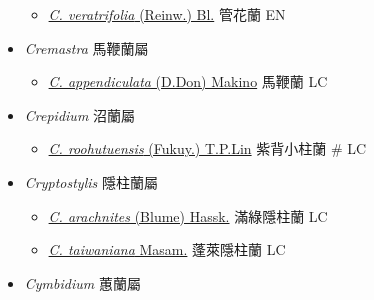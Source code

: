 \begin{itemize}
  \begin{itemize}
        \item[] \href{http://www.theplantlist.org/tpl1.1/search?q=Corymborkis+veratrifolia}{\textit{C. veratrifolia} (Reinw.) Bl.}   管花蘭   EN
  \end{itemize}
 \item[] \textit{Cremastra} 馬鞭蘭屬
                                
  \begin{itemize}
        \item[] \href{http://www.theplantlist.org/tpl1.1/search?q=Cremastra+appendiculata}{\textit{C. appendiculata} (D.Don) Makino}   馬鞭蘭   LC
  \end{itemize}
 \item[] \textit{Crepidium} 沼蘭屬
                                
  \begin{itemize}
        \item[] \href{http://www.theplantlist.org/tpl1.1/search?q=Crepidium+roohutuensis}{\textit{C. roohutuensis} (Fukuy.) T.P.Lin}   紫背小柱蘭  \# LC
  \end{itemize}
 \item[] \textit{Cryptostylis} 隱柱蘭屬
                                
  \begin{itemize}
        \item[] \href{http://www.theplantlist.org/tpl1.1/search?q=Cryptostylis+arachnites}{\textit{C. arachnites} (Blume) Hassk.}   滿綠隱柱蘭   LC
        \item[] \href{http://www.theplantlist.org/tpl1.1/search?q=Cryptostylis+taiwaniana}{\textit{C. taiwaniana} Masam.}   蓬萊隱柱蘭   LC
  \end{itemize}
 \item[] \textit{Cymbidium} 蕙蘭屬
                                

\end{itemize}

